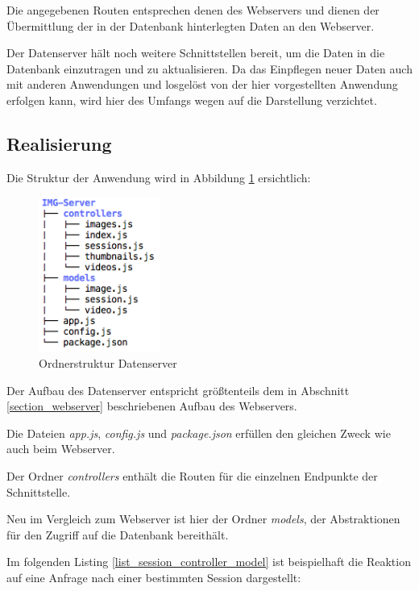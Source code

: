 Die angegebenen Routen entsprechen denen des Webservers und dienen der Übermittlung 
der in der Datenbank hinterlegten Daten an den Webserver.

Der Datenserver hält noch weitere Schnittstellen bereit, um die Daten in die Datenbank einzutragen
und zu aktualisieren. Da das Einpflegen neuer Daten auch mit anderen Anwendungen und losgelöst
von der hier vorgestellten Anwendung erfolgen kann, wird hier des Umfangs wegen auf die Darstellung verzichtet.

\subsection{Realisierung}
Die Struktur der Anwendung wird in Abbildung \ref{fig_struktur_datenserver} ersichtlich:

\begin{figure}[h]
	\centering
	\includegraphics[width=4cm]{bilder/ordnerstruktur_datenserver}
	\caption{Ordnerstruktur Datenserver}
	\label{fig_struktur_datenserver}
\end{figure}

Der Aufbau des Datenserver entspricht größtenteils dem in Abschnitt \ref{section_webserver} beschriebenen Aufbau des Webservers.

Die Dateien \textit{app.js}, \textit{config.js} und \textit{package.json} erfüllen 
den gleichen Zweck wie auch beim Webserver.

Der Ordner \textit{controllers} enthält die Routen für die einzelnen Endpunkte der Schnittstelle.

Neu im Vergleich zum Webserver ist hier der Ordner \textit{models}, der Abstraktionen 
für den Zugriff auf die Datenbank bereithält. %

Im folgenden Listing \ref{list_session_controller_model} ist beispielhaft die Reaktion 
auf eine Anfrage nach einer bestimmten Session dargestellt:

